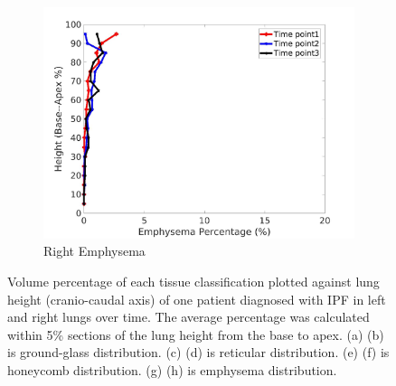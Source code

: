 \begin{figure}[H]
\begin{subfigure}{.42\linewidth}
  \includegraphics[width=\linewidth,trim={{.0\wd0} {.0\wd0} {.0\wd0} {.0\wd0}},clip]{QuantitativeAnalysis/Image/IPF21RightLungEmphysemaDiseaseAgainstHeight.jpg}
  \caption{Right Emphysema}
  \label{fig:IPF21DiseaseAgainstHeightMain-h}
\end{subfigure}
\caption{Volume percentage of each tissue classification plotted against lung height (cranio-caudal axis) of one patient diagnosed with IPF in left and right lungs over time. The average percentage was calculated within 5\% sections of the lung height from the base to apex. (a) (b) is ground-glass distribution. (c) (d) is reticular distribution. (e) (f) is honeycomb distribution. (g) (h) is emphysema distribution.}
\label{fig:IPF21DiseaseAgainstHeightMain}
\end{figure}

